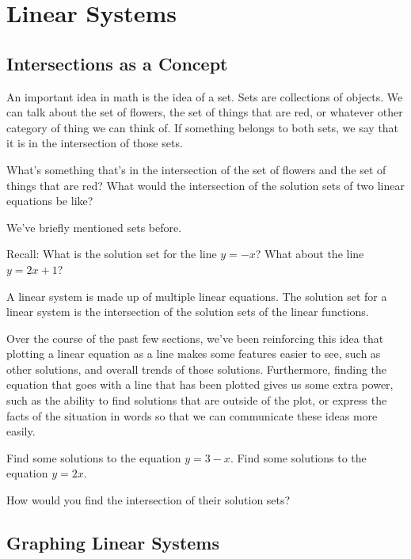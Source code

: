 \chapter{Linear Systems}
\section{Intersections as a Concept}

An important idea in math is the idea of a set.  Sets are collections of objects.  We can talk about the set of flowers, the set of things that are red, or whatever other category of thing we can think of.  If something belongs to both sets, we say that it is in the intersection of those sets.

\begin{prblm}
What's something that's in the intersection of the set of flowers and the set of things that are red?
What would the intersection of the solution sets of two linear equations be like?
\end{prblm}

We've briefly mentioned sets before.

Recall: What is the solution set for the line $y=-x$? What about the line $y=2x+1$?


\begin{defn}
A linear system is made up of multiple linear equations. The solution set for a linear system is the intersection of the solution sets of the linear functions. 
\end{defn}

Over the course of the past few sections, we've been reinforcing this idea that plotting a linear equation as a line makes some features easier to see, such as other solutions, and overall trends of those solutions.  Furthermore, finding the equation that goes with a line that has been plotted gives us some extra power, such as the ability to find solutions that are outside of the plot, or express the facts of the situation in words so that we can communicate these ideas more easily.

\begin{problem}
Find some solutions to the equation $y = 3 - x$.
Find some solutions to the equation $y = 2x$.

How would you find the intersection of their solution sets?
\end{problem}

\section{Graphing Linear Systems}

